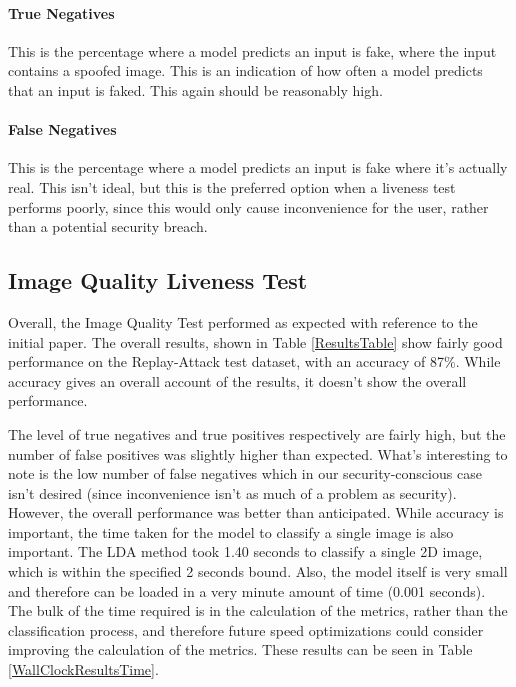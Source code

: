 \documentclass[10pt,a4paper]{article}
\begin{document}
            \paragraph{True Negatives}
                This is the percentage where a model predicts an input is fake, where the input contains a spoofed image. This is an indication of how often a model predicts that an input is faked.
                This again should be reasonably high.

            \paragraph{False Negatives}
                This is the percentage where a model predicts an input is fake where it's actually real. This isn't ideal, but this is the preferred option when a liveness test performs poorly, since
                this would only cause inconvenience for the user, rather than a potential security breach.
            
   
    \subsection{Image Quality Liveness Test}
        Overall, the Image Quality Test performed as expected with reference to the initial paper.\cite{ImageQualityAssessmentTest}
        The overall results, shown in Table \ref{ResultsTable} show fairly good performance on the Replay-Attack test dataset, with an accuracy of 87\%. While accuracy gives an overall account of the results, it doesn't show the overall performance.
        
        The level of true negatives and true positives respectively are fairly high, but the number of false positives was slightly higher than expected.
        What's interesting to note is the low number of false negatives which in our security-conscious case isn't desired (since inconvenience isn't as much of a problem as security).
        However, the overall performance was better than anticipated.
        While accuracy is important, the time taken for the model to classify a single image is also important. The LDA method took 1.40 seconds to classify a single 2D image, which is within the specified 2 seconds bound.
        Also, the model itself is very small and therefore can be loaded in a very minute amount of time (0.001 seconds). The bulk of the time required is in the calculation of the metrics, rather than the classification process,
        and therefore future speed optimizations could consider improving the calculation of the metrics. These results can be seen in Table \ref{WallClockResultsTime}.
\end{document}
